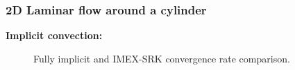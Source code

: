 \begin{frame}
\frametitle{2D Laminar flow around a cylinder}
\textbf{Implicit convection:}
\begin{figure}[h!]
  \centering
  \caption{Fully implicit and IMEX-SRK convergence rate comparison.}
  \label{fig:IMEX_RK_cyl_conv_impl_expl}
\end{figure}
\end{frame}



